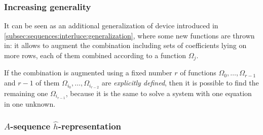 \subsubsection{Increasing generality}
It can be seen as an additional generalization of device introduced in
\autoref{subsec:sequences:interluce:generalization},
where some new functions are thrown in: it allows to augment the
combination including sets of coefficients lying on more rows, 
each of them combined according to a function $\Omega_{j}$. 

If the combination is augmented using a fixed number $r$ 
of functions $\Omega_{0},\ldots,\Omega_{r-1}$
and $r-1$ of them $\Omega_{i_{0}},\ldots,\Omega_{i_{r-2}}$
are \emph{explicitly defined}, then it is possible to find 
the remaining one $\Omega_{i_{r-1}}$, because it is the same to solve a system
with one equation in one unknown.



\subsubsection{$A$-sequence $\hat{h}$-representation}

